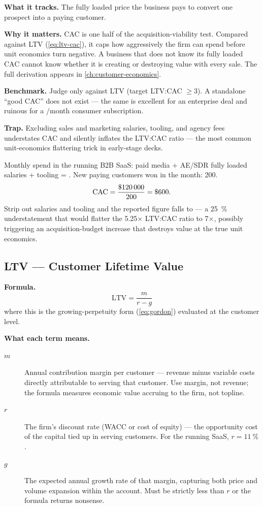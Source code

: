 \textbf{What it tracks.} The fully loaded price the business pays to convert one prospect
into a paying customer.

\textbf{Why it matters.} CAC is one half of the acquisition-viability test. Compared against
LTV (\cref{eq:ltv-cac}), it caps how aggressively the firm can spend before unit economics
turn negative. A business that does not know its fully loaded CAC cannot know whether it is
creating or destroying value with every sale. The full derivation appears in
\cref{ch:customer-economics}.

\textbf{Benchmark.} Judge only against LTV (target LTV:CAC $\ge 3$). A standalone ``good
CAC'' does not exist --- the same  is excellent for an enterprise deal and ruinous
for a /month consumer subscription.

\textbf{Trap.} Excluding sales and marketing salaries, tooling, and agency fees
understates CAC and silently inflates the LTV:CAC ratio --- the most common unit-economics
flattering trick in early-stage decks.

\begin{example}
Monthly spend in the running B2B SaaS: paid media  + AE/SDR fully loaded
salaries  + tooling  = . New paying customers won in
the month: 200.
\[
  \mathrm{CAC} = \frac{\$\num{120000}}{200} = \$\num{600}.
\]
Strip out salaries and tooling and the reported figure falls to  --- a
\qty{25}{\percent} understatement that would flatter the 5.25$\times$ LTV:CAC ratio to
7$\times$, possibly triggering an acquisition-budget increase that destroys value at the true
unit economics.
\end{example}


\subsection{LTV --- Customer Lifetime Value}

\textbf{Formula.}
\[
  \mathrm{LTV} = \frac{m}{r - g}
\]
where this is the growing-perpetuity form (\cref{eq:gordon}) evaluated at the customer level.

\textbf{What each term means.}
\begin{description}
  \item[$m$] Annual contribution margin per customer --- revenue minus variable costs directly
    attributable to serving that customer. Use margin, not revenue; the formula measures
    economic value accruing to the firm, not topline.
  \item[$r$] The firm's discount rate (WACC or cost of equity) --- the opportunity cost of
    the capital tied up in serving customers. For the running SaaS, $r = \qty{11}{\percent}$.
  \item[$g$] The expected annual growth rate of that margin, capturing both price and volume
    expansion within the account. Must be strictly less than $r$ or the formula returns
    nonsense.
\end{description}

